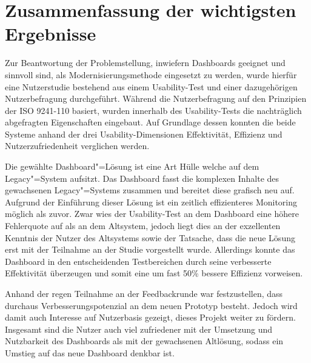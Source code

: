 \section{Zusammenfassung der wichtigsten Ergebnisse}

Zur Beantwortung der Problemstellung, inwiefern Dash\-boards geeignet und sinnvoll sind, als Modernisierungsmethode eingesetzt zu werden, wurde hierfür eine Nutzerstudie bestehend aus einem Usability-Test und einer dazugehörigen Nutzerbefragung durchgeführt. Während die Nutzerbefragung auf den Prinzipien der ISO 9241-110 basiert, wurden innerhalb des Usability-Tests die nachträglich abgefragten Eigenschaften eingebaut. Auf Grundlage dessen konnten die beide Systeme anhand der drei Usability-Dimensionen Effektivität, Effizienz und Nutzerzufriedenheit verglichen werden.


Die gewählte Dash\-board"=Lösung ist eine Art Hülle welche auf dem Legacy"=System aufsitzt. Das Dash\-board fasst die komplexen Inhalte des gewachsenen Legacy"=Systems zusammen und bereitet diese grafisch neu auf. Aufgrund der Einführung dieser Lösung ist ein zeitlich effizienteres Monitoring möglich als zuvor. Zwar wies der Usability-Test an dem Dash\-board eine höhere Fehlerquote auf als an dem Altsystem, jedoch liegt dies an der exzellenten Kenntnis der Nutzer des Altsystems sowie der Tatsache, dass die neue Lösung erst mit der Teilnahme an der Studie vorgestellt wurde. Allerdings konnte das Dash\-board in den entscheidenden Testbereichen durch seine verbesserte Effektivität überzeugen und somit eine um fast 50\% bessere Effizienz vorweisen.

Anhand der regen Teilnahme an der Feedbackrunde war festzustellen, dass durchaus Verbesserungspotenzial an dem neuen Prototyp besteht. Jedoch wird damit auch Interesse auf Nutzerbasis gezeigt, dieses Projekt weiter zu fördern. Insgesamt sind die Nutzer auch viel zufriedener mit der Umsetzung und Nutzbarkeit des Dash\-boards als mit der gewachsenen Altlösung, sodass ein Umstieg auf das neue Dash\-board denkbar ist.

